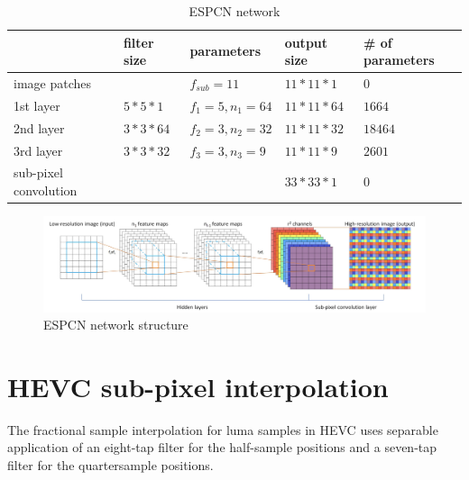 \documentclass[12pt,journal,compsoc]{IEEEtran}
\begin{document}
\begin{table}[]
\normalsize
\renewcommand{\arraystretch}{1.3} 
\caption{ESPCN network} 
\label{table_2} 
\centering
\begin{tabular}{|l|l|l|l|l|}
\hline
              & filter size   & parameters      & output size & \# of parameters 	\\ \hline
image patches &               & $f_{sub}=11$    & $11*11*1$   & $0$  	\\ \hline
1st layer     & $5*5*1$       & $f_1=5, n_1=64$ & $11*11*64$  & $1664$ 	\\ \hline
2nd layer     & $3*3*64$      & $f_2=3, n_2=32$ & $11*11*32$  & $18464$ 	\\ \hline
3rd layer     & $3*3*32$      & $f_3=3, n_3=9$  & $11*11*9$   & $2601$  	\\ \hline
sub-pixel convolution     &       &   & $33*33*1$   & $0$  	\\ 
	\hline
\end{tabular}
\vspace*{4pt}
\end{table}

\begin{figure}[!t]
\normalsize
\centering
\includegraphics[width=7in]{3_espcn.png}
\vspace*{4pt} 
\caption{ESPCN network structure}
\label{fig_espcn}
\end{figure}


\section{HEVC sub-pixel interpolation}
The fractional sample interpolation for luma samples in HEVC uses separable application of an eight-tap filter for the half-sample positions and a seven-tap filter for the quartersample positions.
\end{document}
